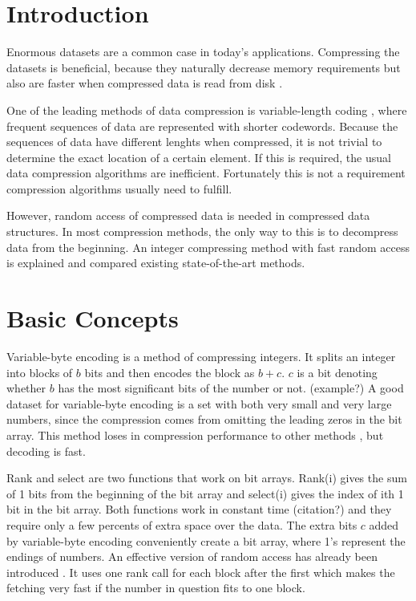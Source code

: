 \chapter{Introduction}
Enormous datasets are a common case in today's applications. Compressing the datasets is beneficial, because they 
naturally decrease memory requirements but also are faster when compressed data is read from disk \citep{Zob95}.

One of the leading methods of data compression is variable-length coding \citep{Sal99}, where frequent sequences of data
are represented with shorter codewords. Because the sequences of data have different lenghts when compressed, it is 
not trivial to determine the exact location of a certain element. If this is required, the usual data compression algorithms are
inefficient. Fortunately this is not a requirement compression algorithms usually need to fulfill. 

However, random access of compressed data is needed in compressed data structures. In most compression methods, the only way 
to this is to decompress data from the beginning. An integer compressing method with fast random access is explained and compared
existing state-of-the-art methods.

\chapter{Basic Concepts}
Variable-byte encoding \citep{Wil99} is a method of compressing integers. It splits an integer into blocks of $b$ bits and then encodes
the block as $b + c$. $c$ is a bit denoting whether $b$ has the most significant bits of the number or not. (example?) A good dataset for variable-byte encoding
is a set with both very small and very large numbers, since the compression comes from omitting the leading zeros in the bit array. This method 
loses in compression performance to other methods \citep{Bri09}, but decoding is fast.

Rank and select are two functions that work on bit arrays. Rank(i) gives the sum of 1 bits from the beginning of the bit array and select(i) gives
the index of ith 1 bit in the bit array. Both functions work in constant time (citation?) and they require only a few percents of extra space over
the data. The extra bits $c$ added by variable-byte encoding conveniently create a bit array, where 1's represent the endings of numbers. An effective
version of random access has already been introduced \citep{Bri09}. It uses one rank call for each block after the first which makes the fetching very
fast if the number in question fits to one block.

